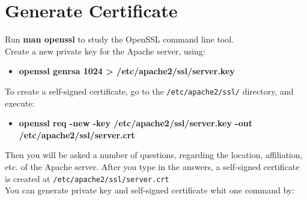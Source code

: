 \documentclass[10pt,a4paper]{article}
\numberwithin{equation}{section}
\numberwithin{figure}{section}
\numberwithin{table}{section}
\begin{document}
\section{Generate Certificate}
	Run \textbf{man openssl} to study the OpenSSL command line tool.\\
	Create a new private key for the Apache server, using:
	\begin{itemize}
		\item \textbf{openssl genrsa 1024 > /etc/apache2/ssl/server.key}
	\end{itemize}
	To create a self-signed certificate, go to the \texttt{/etc/apache2/ssl/} directory, and execute:
	\begin{itemize}
		\item \textbf{openssl req -new -key /etc/apache2/ssl/server.key -out /etc/apache2/ssl/server.crt}
	\end{itemize}
	Then you will be asked a number of questions, regarding the location, affiliation, etc. of the Apache server. After you type in the answers, a self-signed certificate is created at \texttt{/etc/apache2/ssl/server.crt}\\
	You can generate private key and self-signed certificate whit one command by:
\end{document}
